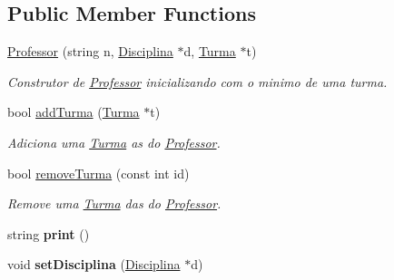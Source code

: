 \subsection*{Public Member Functions}
\begin{DoxyCompactItemize}
\item 
\hypertarget{class_professor_a8e20e8472f95da9e7dbbe043b2ca40c0}{\hyperlink{class_professor_a8e20e8472f95da9e7dbbe043b2ca40c0}{Professor} (string n, \hyperlink{class_disciplina}{Disciplina} $\ast$d, \hyperlink{class_turma}{Turma} $\ast$t)}\label{class_professor_a8e20e8472f95da9e7dbbe043b2ca40c0}

\begin{DoxyCompactList}\small\item\em Construtor de \hyperlink{class_professor}{Professor} inicializando com o minimo de uma turma. \end{DoxyCompactList}\item 
\hypertarget{class_professor_a4242c678534b7effaec214ad2f8a3079}{bool \hyperlink{class_professor_a4242c678534b7effaec214ad2f8a3079}{add\-Turma} (\hyperlink{class_turma}{Turma} $\ast$t)}\label{class_professor_a4242c678534b7effaec214ad2f8a3079}

\begin{DoxyCompactList}\small\item\em Adiciona uma \hyperlink{class_turma}{Turma} as do \hyperlink{class_professor}{Professor}. \end{DoxyCompactList}\item 
\hypertarget{class_professor_a1cc34746e255348252f50e0b6ab34e41}{bool \hyperlink{class_professor_a1cc34746e255348252f50e0b6ab34e41}{remove\-Turma} (const int id)}\label{class_professor_a1cc34746e255348252f50e0b6ab34e41}

\begin{DoxyCompactList}\small\item\em Remove uma \hyperlink{class_turma}{Turma} das do \hyperlink{class_professor}{Professor}. \end{DoxyCompactList}\item 
\hypertarget{class_professor_a3fcf6e5e91713f69e178d3c77524f9bc}{string {\bfseries print} ()}\label{class_professor_a3fcf6e5e91713f69e178d3c77524f9bc}

\item 
\hypertarget{class_professor_a6670967a09f78b6d0016a2e3417c238f}{void {\bfseries set\-Disciplina} (\hyperlink{class_disciplina}{Disciplina} $\ast$d)}\label{class_professor_a6670967a09f78b6d0016a2e3417c238f}


\end{DoxyCompactItemize}
